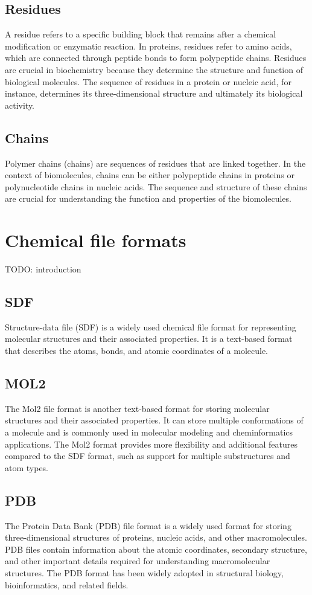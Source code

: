 \documentclass[
  digital,     %
  oneside,     %
  nosansbold,  %
  nocolorbold, %
  lof,         %
  lot,         %
]{fithesis4}
\begin{document}
\subsection{Residues}
A residue refers to a specific building block that remains after a chemical modification or enzymatic reaction.
In proteins, residues refer to amino acids, which are connected through peptide bonds to form polypeptide chains.
Residues are crucial in biochemistry because they determine the structure and function of biological molecules.
The sequence of residues in a protein or nucleic acid, for instance, determines its three-dimensional structure and ultimately its biological activity.

\subsection{Chains}
Polymer chains (chains) are sequences of residues that are linked together. In the context of biomolecules, chains can be either polypeptide chains in proteins or polynucleotide chains in nucleic acids. The sequence and structure of these chains are crucial for understanding the function and properties of the biomolecules.

\section{Chemical file formats}
TODO: introduction

\subsection{SDF}
Structure-data file (SDF) is a widely used chemical file format for representing molecular structures and their associated properties. It is a text-based format that describes the atoms, bonds, and atomic coordinates of a molecule. 

\subsection{MOL2}
The Mol2 file format is another text-based format for storing molecular structures and their associated properties. It can store multiple conformations of a molecule and is commonly used in molecular modeling and cheminformatics applications. The Mol2 format provides more flexibility and additional features compared to the SDF format, such as support for multiple substructures and atom types.

\subsection{PDB}
The Protein Data Bank (PDB) file format is a widely used format for storing three-dimensional structures of proteins, nucleic acids, and other macromolecules. PDB files contain information about the atomic coordinates, secondary structure, and other important details required for understanding macromolecular structures. The PDB format has been widely adopted in structural biology, bioinformatics, and related fields.
\end{document}
